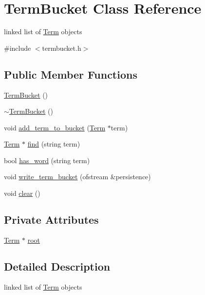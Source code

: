 \hypertarget{class_term_bucket}{}\section{Term\+Bucket Class Reference}
\label{class_term_bucket}


linked list of \hyperlink{class_term}{Term} objects  




{\ttfamily \#include $<$termbucket.\+h$>$}

\subsection*{Public Member Functions}
\begin{DoxyCompactItemize}
\item 
\hyperlink{class_term_bucket_a2f45be1b657541ccf0d255b5a4a4b6e7}{Term\+Bucket} ()
\item 
\hyperlink{class_term_bucket_a2995af64e66038cce2604cd26f27b743}{$\sim$\+Term\+Bucket} ()
\item 
void \hyperlink{class_term_bucket_ad8bccbf5570ca903ec3b5b7e6d90da83}{add\+\_\+term\+\_\+to\+\_\+bucket} (\hyperlink{class_term}{Term} $\ast$term)
\item 
\hyperlink{class_term}{Term} $\ast$ \hyperlink{class_term_bucket_a637756154b34dce701969c0e930a0de5}{find} (string term)
\item 
bool \hyperlink{class_term_bucket_aa5f0d336448063bea5d33a090ac09785}{has\+\_\+word} (string term)
\item 
void \hyperlink{class_term_bucket_a9f861191a65c27611a4b15773b379716}{write\+\_\+term\+\_\+bucket} (ofstream \&persistence)
\item 
void \hyperlink{class_term_bucket_a8aa95625bf111166efd958f34e0da1e2}{clear} ()
\end{DoxyCompactItemize}
\subsection*{Private Attributes}
\begin{DoxyCompactItemize}
\item 
\hyperlink{class_term}{Term} $\ast$ \hyperlink{class_term_bucket_afffcce881e1d712ca56bc535d9c9dc0f}{root}
\end{DoxyCompactItemize}


\subsection{Detailed Description}
linked list of \hyperlink{class_term}{Term} objects 

